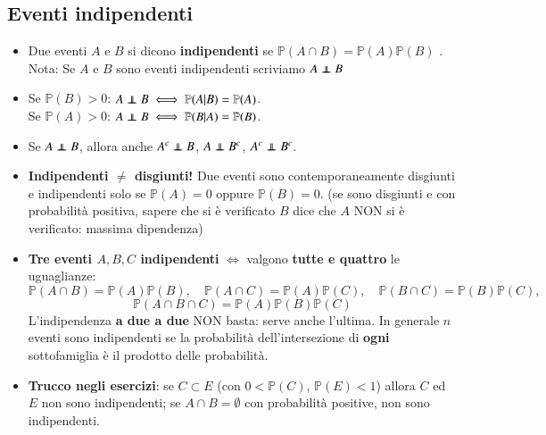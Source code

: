 \documentclass[12pt]{extarticle} %
\newcommand\independent{\protect\mathpalette{\protect\independenT}{\perp}}
\def\independenT#1#2{\mathrel{\rlap{$#1#2$}\mkern2mu{#1#2}}}
\begin{document}
\vspace{0.4cm}
\subsection{Eventi indipendenti}
\begin{itemize}
    \item Due eventi $A$ e $B$ si dicono \textbf{indipendenti} se $ \mathbb{P}(A \cap B) = \mathbb{P}(A)\mathbb{P}(B) $ . \\ {\footnotesize Nota: Se $A$ e $B$ sono eventi indipendenti scriviamo $A \mathrel{\independent} B$}

    \item Se $\mathbb{P}(B) > 0$: \quad $A \mathrel{\independent} B \iff \mathbb{P}(A|B) = \mathbb{P}(A)$. \\ Se $\mathbb{P}(A) > 0$: \quad $A \mathrel{\independent} B \iff \mathbb{P}(B|A) = \mathbb{P}(B)$.

    \item Se $A \mathrel{\independent} B$, allora anche $A^c \mathrel{\independent} B$, \; $A \mathrel{\independent} B^c$, \; $A^c \mathrel{\independent} B^c$.

    \item \textbf{Indipendenti $\ne$ disgiunti!} Due eventi sono contemporaneamente disgiunti e indipendenti solo se $\mathbb{P}(A) = 0$ oppure $\mathbb{P}(B) = 0$. {\footnotesize (se sono disgiunti e con probabilità positiva, sapere che si è verificato $B$ dice che $A$ NON si è verificato: massima dipendenza)}

    \item \textbf{Tre eventi $A,B,C$ indipendenti} $\iff$ valgono \textbf{tutte e quattro} le uguaglianze:
    $$ \mathbb{P}(A \cap B) = \mathbb{P}(A)\mathbb{P}(B), \quad \mathbb{P}(A \cap C) = \mathbb{P}(A)\mathbb{P}(C), \quad \mathbb{P}(B \cap C) = \mathbb{P}(B)\mathbb{P}(C), $$
    $$ \mathbb{P}(A \cap B \cap C) = \mathbb{P}(A)\mathbb{P}(B)\mathbb{P}(C) $$
    {\footnotesize L'indipendenza \textbf{a due a due} NON basta: serve anche l'ultima. In generale $n$ eventi sono indipendenti se la probabilità dell'intersezione di \textbf{ogni} sottofamiglia è il prodotto delle probabilità.}

    \item \textbf{Trucco negli esercizi}: se $C \subset E$ (con $0<\mathbb{P}(C)$, $\mathbb{P}(E)<1$) allora $C$ ed $E$ non sono indipendenti; se $A \cap B = \emptyset$ con probabilità positive, non sono indipendenti.
\end{itemize}
\end{document}
